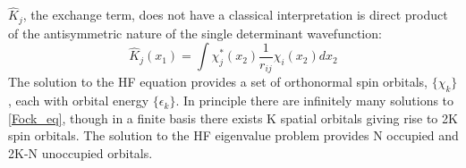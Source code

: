     $\hat{K}_j$, the exchange term, does not have a classical interpretation%
    is direct product of the antisymmetric nature of the single determinant wavefunction:
      \begin{equation} \label{k}
      \hat{K}_j(x_1) = \int \chi_j^*(x_2) \frac{1}{r_{ij}} \chi_i(x_2) dx_2
      \end{equation}
    The solution to the HF equation provides a set of orthonormal spin orbitals, $\{ \chi_k \}$, each with orbital energy $\{\epsilon_k\}$. In principle there are infinitely many solutions to \cref{Fock_eq}, though in a finite basis there exists K spatial orbitals giving rise to 2K spin orbitals. The solution to the HF eigenvalue problem provides N occupied and 2K-N unoccupied orbitals.
    
